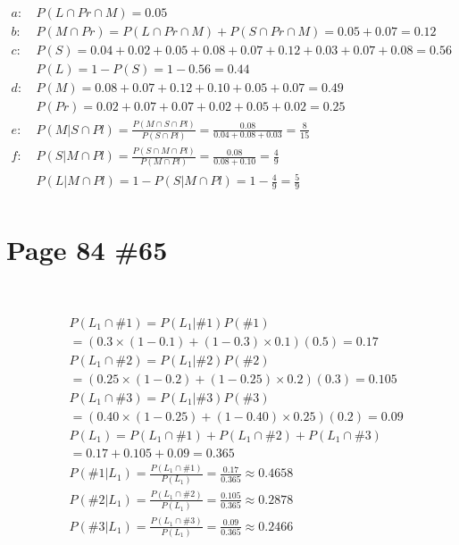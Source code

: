\documentclass{article}
\begin{document}
\begin{align*}
    a:\ &P(L\cap Pr\cap M)=0.05\\
    b:\ &P(M\cap Pr)=P(L\cap Pr\cap M)+P(S\cap Pr\cap M)=0.05+0.07=0.12\\
    c:\ &P(S)=0.04+0.02+0.05+0.08+0.07+0.12+0.03+0.07+0.08=0.56\\
    &P(L)=1-P(S)=1-0.56=0.44\\
    d:\ &P(M)=0.08+0.07+0.12+0.10+0.05+0.07=0.49\\
    &P(Pr)=0.02+0.07+0.07+0.02+0.05+0.02=0.25\\
    e:\ &P(M|S\cap Pl)=\frac{P(M\cap S\cap Pl)}{P(S\cap Pl)}=\frac{0.08}{0.04+0.08+0.03}=\frac{8}{15}\\
    f:\ &P(S|M\cap Pl)=\frac{P(S\cap M\cap Pl)}{P(M\cap Pl)}=\frac{0.08}{0.08+0.10}=\frac{4}{9}\\
    &P(L|M\cap Pl)=1-P(S|M\cap Pl)=1-\frac{4}{9}=\frac{5}{9}\\
\end{align*}

\newpage

\section*{Page 84 \#65}

~

\begin{align*}
    &P(L_1\cap \#1)=P(L_1|\#1)P(\#1)\\
    &=(0.3\times (1-0.1)+(1-0.3)\times 0.1)(0.5)=0.17\\
    &P(L_1\cap \#2)=P(L_1|\#2)P(\#2)\\
    &=(0.25\times (1-0.2)+(1-0.25)\times 0.2)(0.3)=0.105\\
    &P(L_1\cap \#3)=P(L_1|\#3)P(\#3)\\
    &=(0.40\times (1-0.25)+(1-0.40)\times 0.25)(0.2)=0.09\\
    &P(L_1)=P(L_1\cap \#1)+P(L_1\cap \#2)+P(L_1\cap \#3)\\
    &=0.17+0.105+0.09=0.365\\
    &P(\#1|L_1)=\frac{P(L_1\cap \#1)}{P(L_1)}=\frac{0.17}{0.365}\approx 0.4658\\
    &P(\#2|L_1)=\frac{P(L_1\cap \#2)}{P(L_1)}=\frac{0.105}{0.365}\approx 0.2878\\
    &P(\#3|L_1)=\frac{P(L_1\cap \#3)}{P(L_1)}=\frac{0.09}{0.365}\approx 0.2466\\
\end{align*}
\end{document}
